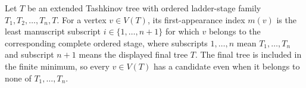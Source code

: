 \begin{definition}
Let \(T\) be an extended Tashkinov tree with ordered ladder-stage family
\(T_1,T_2,\ldots,T_n,T\).  For a vertex \(v\in V(T)\), its
first-appearance index \(m(v)\) is the least manuscript subscript
\(i\in\{1,\ldots,n+1\}\) for which \(v\) belongs to the corresponding
complete ordered stage, where subscripts \(1,\ldots,n\) mean
\(T_1,\ldots,T_n\) and subscript \(n+1\) means the displayed final tree
\(T\).  The final tree is included in the finite minimum, so every
\(v\in V(T)\) has a candidate even when it belongs to none of
\(T_1,\ldots,T_n\).
\end{definition}
